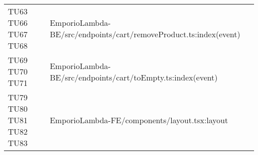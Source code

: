 {\begin{longtable}{C{2cm} C{12.8cm}}
TU63 \newline TU66 \newline TU67 \newline TU68 & EmporioLambda-BE/src/endpoints/cart/removeProduct.ts:index(event)\\

TU69 \newline TU70 \newline TU71 & EmporioLambda-BE/src/endpoints/cart/toEmpty.ts:index(event)\\

TU79 \newline TU80 \newline TU81 \newline TU82 \newline TU83 & EmporioLambda-FE/components/layout.tsx:layout




\end{longtable}

}


